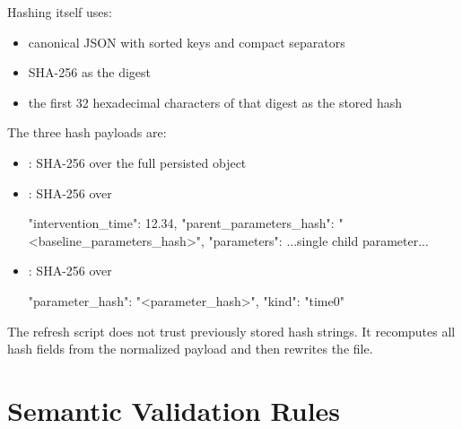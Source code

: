 \documentclass[11pt]{article}
\begin{document}
Hashing itself uses:
\begin{itemize}
\item canonical JSON with sorted keys and compact separators
\item SHA-256 as the digest
\item the first 32 hexadecimal characters of that digest as the stored hash
\end{itemize}

The three hash payloads are:
\begin{itemize}
\item {}: SHA-256 over the full persisted  object
\item {}: SHA-256 over
\begin{DocCode}
{
  "intervention_time": 12.34,
  "parent_parameters_hash": "<baseline_parameters_hash>",
  "parameters": { ...single child parameter... }
}
\end{DocCode}
\item {}: SHA-256 over
\begin{DocCode}
{
  "parameter_hash": "<parameter_hash>",
  "kind": "time0"
}
\end{DocCode}
\end{itemize}


The refresh script does not trust previously stored hash strings. It recomputes all hash
fields from the normalized payload and then rewrites the file.

\section*{Semantic Validation Rules}
\end{document}
